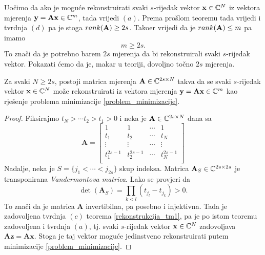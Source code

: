 \documentclass[a4paper,twoside,12pt]{memoir} %
\newcommand{\vect}[1]{\mathbf{#1}}
\renewcommand{\vec}{\vect}
\newcommand{\rank}{\text\normalfont{rank}}
\begin{document}
Uo\v{c}imo da ako je mogu\'ce rekonstruirati svaki $s$-rijedak vektor $\vec x \in \C^N$ iz vektora mjerenja $\vec y = \vec{Ax} \in \C^m$, tada vrijedi $(a)$. Prema pro\v{s}lom teoremu tada vrijedi i tvrdnja $(d)$ pa je stoga $\rank(\vec A) \geq 2s$. Tako\dj er vrijedi da je $\rank(\vec A) \leq m$ pa imamo 
\begin{equation*}
    m \geq 2s.    
\end{equation*}
To zna\v{c}i da je potrebno barem $2s$ mjerenja da bi rekonstruirali svaki $s$-rijedak vektor. Pokazati \'cemo da je, makar u teoriji, dovoljno to\v{c}no $2s$ mjerenja.

\begin{thm}
    Za svaki $N \geq 2s$, postoji matrica mjerenja $\vec A \in \C^{2s \times N}$ takva da se svaki $s$-rijedak vektor $\vec x \in \C^N$ mo\v{z}e rekonstruirati iz vektora mjerenja $\vec y = \vec{Ax} \in \C^m$ kao rje\v{s}enje problema minimizacije \eqref{problem_minimizacije}.
\end{thm}
\begin{proof}
    Fiksirajmo $t_N>\cdots t_2 > t_1 > 0$ i neka je $\vec A \in \C^{2s \times N}$ dana sa
    \begin{equation}\label{vandermont_matrica}
        \vec A = 
        \begin{bmatrix}
            1 & 1 & \cdots & 1 \\ 
            t_1 & t_2 & \cdots & t_N \\
            \vdots & \vdots & \cdots & \vdots \\
            t_1^{2s-1} & t_2^{2s-1} & \cdots & t_N^{2s-1} \\
        \end{bmatrix}
    \end{equation}
    Nadalje, neka je $S=\{j_1 < \cdots < j_{2s}\}$ skup indeksa. Matrica $\vec A_S \in \C^{2s \times 2s}$ je transponirana \textit{Vandermontova matrica}. Lako se provjeri da
    \begin{equation*}
        \det(\vec{A}_S) = \prod_{k < l} (t_{j_l} - t_{j_k})>0.
    \end{equation*}
    To zna\v{c}i da je matrica $\vec A$ invertibilna, pa posebno i injektivna. Tada je zadovoljena tvrdnja $(c)$ teorema \eqref{rekonstrukcija_tm1}, pa je po istom teoremu zadovoljena i tvrdnja $(a)$, tj. svaki $s$-rijedak vektor $\vec x \in \C^N$ zadovoljava $\vec{Az}=\vec{Ax}$. Stoga je taj vektor mogu\'ce jedinstveno rekonstruirati putem minimizacije \eqref{problem_minimizacije}.
\end{proof}
\end{document}
